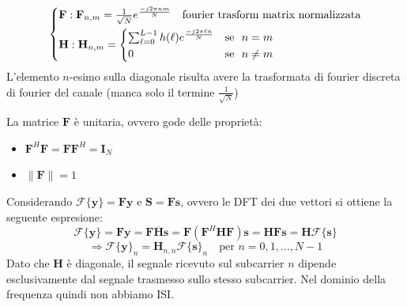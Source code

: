 \[
    \begin{cases*}
        \mathbf{F}: \mathbf{F}_{n, m} = \frac{1}{\sqrt{N}} e^{\frac{-j2\pi nm}{N}} \quad \text{fourier trasform matrix normalizzata} \\
        \mathbf{H}: \mathbf{H}_{n, m} = \begin{cases*}
                                                        \sum_{\ell=0}^{L-1} h(\ell) e^{\frac{-j2\pi \ell n}{N}} & \text{se } $n = m$ \\
                                                        0 & \text{se } $n \neq m$
                                                    \end{cases*}
    \end{cases*}
\]
L'elemento $n$-esimo sulla diagonale risulta avere la trasformata di fourier discreta di fourier del canale (manca solo il termine $\frac{1}{\sqrt{N}}$)


La matrice $\mathbf{F}$ è unitaria, ovvero gode delle proprietà:
\begin{itemize}
    \item $\mathbf{F}^H \mathbf{F} = \mathbf{F} \mathbf{F}^H = \mathbf{I}_N$
    \item $\| \mathbf{F} \| = 1$ 
\end{itemize}

Considerando $\mathcal{F}\{\mathbf{y}\} = \mathbf{F} \mathbf{y}$ e $\mathbf{S} = \mathbf{F} \mathbf{s}$, ovvero le DFT dei due vettori si ottiene la seguente espresione:
\[
    \mathcal{F}\{\mathbf{y}\} = \mathbf{F} \mathbf{y} = \mathbf{F} \mathbf{\overline{H}} \mathbf{s} = \mathbf{F} \left(\mathbf{F}^H \mathbf{H} \mathbf{F}\right)\mathbf{s} =  \mathbf{H} \mathbf{F} \mathbf{s} = \mathbf{H} \mathcal{F}\{\mathbf{s}\}
\]
\[
    \Rightarrow \mathcal{F}\{\mathbf{y}\}_{n} = \mathbf{H}_{n,n} \mathcal{F}\{\mathbf{s}\}_{n} \quad \text{per } n = 0, 1, \ldots, N-1
\]
Dato che $\mathbf{H}$ è diagonale, il segnale ricevuto sul subcarrier $n$ dipende esclusivamente dal segnale trasmesso sullo stesso subcarrier. Nel dominio della frequenza quindi non abbiamo ISI.


